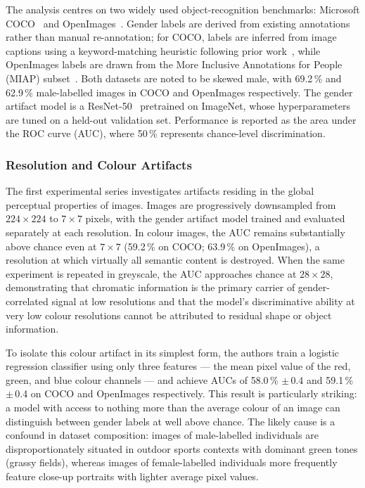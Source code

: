 The analysis centres on two widely used object-recognition benchmarks: Microsoft
COCO~\cite{Lin_2014_COCO} and OpenImages~\cite{Kuznetsova_2020_OpenImagesV4}.  Gender
labels are derived from existing annotations rather than manual re-annotation; for COCO,
labels are inferred from image captions using a keyword-matching heuristic following prior
work~\cite{Zhao_2017_MenAlsoLikeShopping}, while OpenImages labels are drawn from the More
Inclusive Annotations for People (MIAP) subset~\cite{Schumann_2021_StepInclusivePeopleAnnotations}.
Both datasets are noted to be skewed male, with 69.2\,\% and 62.9\,\% male-labelled images
in COCO and OpenImages respectively.  The gender artifact model is a
ResNet-50~\cite{He_2016_DeepResidualLearning} pretrained on ImageNet, whose hyperparameters
are tuned on a held-out validation set.  Performance is reported as the area under the ROC
curve (AUC), where 50\,\% represents chance-level discrimination.

\subsubsection*{Resolution and Colour Artifacts}

The first experimental series investigates artifacts residing in the global perceptual
properties of images.  Images are progressively downsampled from $224\!\times\!224$ to
$7\!\times\!7$ pixels, with the gender artifact model trained and evaluated separately at
each resolution.  In colour images, the AUC remains substantially above chance even at
$7\!\times\!7$ (59.2\,\% on COCO; 63.9\,\% on OpenImages), a resolution at which virtually
all semantic content is destroyed.  When the same experiment is repeated in greyscale, the
AUC approaches chance at $28\!\times\!28$, demonstrating that chromatic information is the
primary carrier of gender-correlated signal at low resolutions and that the model's
discriminative ability at very low colour resolutions cannot be attributed to residual shape
or object information.

To isolate this colour artifact in its simplest form, the authors train a logistic regression
classifier using only three features --- the mean pixel value of the red, green, and blue
colour channels --- and achieve AUCs of 58.0\,\% $\pm$\,0.4 and 59.1\,\% $\pm$\,0.4 on
COCO and OpenImages respectively.  This result is particularly striking: a model with access
to nothing more than the average colour of an image can distinguish between gender labels at
well above chance.  The likely cause is a confound in dataset composition: images of
male-labelled individuals are disproportionately situated in outdoor sports contexts with
dominant green tones (grassy fields), whereas images of female-labelled individuals more
frequently feature close-up portraits with lighter average pixel values.

